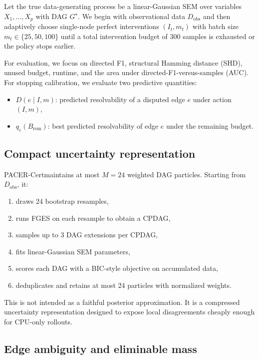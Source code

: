 \documentclass{article}
\newcommand{\method}{PACER-Cert}
\newcommand{\qe}{q_e}
\newcommand{\de}{D}
\begin{document}
Let the true data-generating process be a linear-Gaussian SEM over variables $X_1,\dots,X_p$ with DAG $G^\star$. We begin with observational data $D_{\mathrm{obs}}$ and then adaptively choose single-node perfect interventions $(I_t,m_t)$ with batch size $m_t\in\{25,50,100\}$ until a total intervention budget of 300 samples is exhausted or the policy stops earlier.

For evaluation, we focus on directed F1, structural Hamming distance (SHD), unused budget, runtime, and the area under directed-F1-versus-samples (AUC). For stopping calibration, we evaluate two predictive quantities:
\begin{itemize}
  \item $\de(e\mid I,m)$: predicted resolvability of a disputed edge $e$ under action $(I,m)$,
  \item $\qe(B_{\mathrm{rem}})$: best predicted resolvability of edge $e$ under the remaining budget.
\end{itemize}

\subsection{Compact uncertainty representation}

\method maintains at most $M=24$ weighted DAG particles. Starting from $D_{\mathrm{obs}}$, it:
\begin{enumerate}
  \item draws 24 bootstrap resamples,
  \item runs FGES on each resample to obtain a CPDAG,
  \item samples up to 3 DAG extensions per CPDAG,
  \item fits linear-Gaussian SEM parameters,
  \item scores each DAG with a BIC-style objective on accumulated data,
  \item deduplicates and retains at most 24 particles with normalized weights.
\end{enumerate}

This is not intended as a faithful posterior approximation. It is a compressed uncertainty representation designed to expose local disagreements cheaply enough for CPU-only rollouts.

\subsection{Edge ambiguity and eliminable mass}
\end{document}
